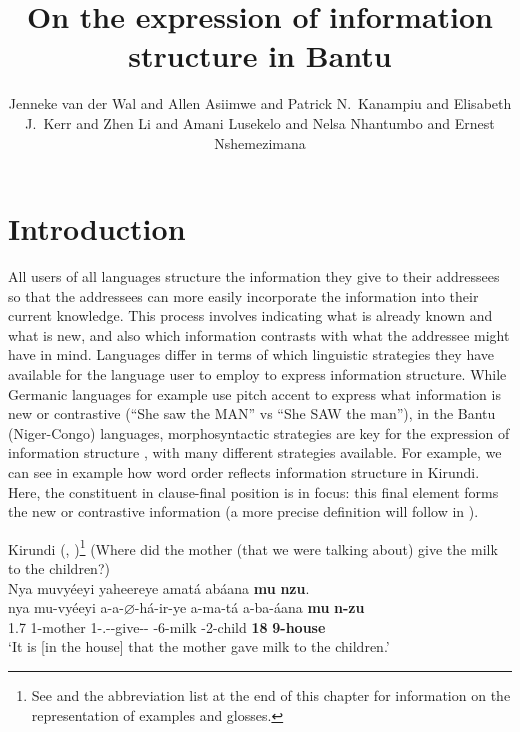\documentclass[output=paper]{langscibook}
\author{Jenneke van der Wal\affiliation{Leiden University} and Allen Asiimwe\affiliation{Makerere University} and Patrick N.\ Kanampiu\affiliation{University of Edinburgh} and Elisabeth J.\ Kerr\affiliation{Ghent University} and Zhen Li\affiliation{Peking University} and Amani Lusekelo\affiliation{Dar es Salaam College of Education} and Nelsa Nhantumbo\affiliation{Universidade Eduardo Mondlane} and Ernest Nshemezimana\affiliation{Université du Burundi}}
\title{On the expression of information structure in Bantu}
\begin{document}
\renewcommand{\lsChapterFooterSize}{\footnotesize}
\maketitle 
\label{ch:1}


\section{Introduction}

All users of all languages structure the information they give to their addressees so that the addressees can more easily incorporate the information into their current knowledge. This process involves indicating what is already known and what is new, and also which information contrasts with what the addressee might have in mind. Languages differ in terms of which linguistic strategies they have available for the language user to employ to express information structure. While Germanic languages for example use pitch accent to express what information is new or contrastive (“She saw the MAN” vs “She SAW the man”), in the Bantu (Niger-Congo) languages, morphosyntactic strategies are key for the expression of information structure \citep{DowningHyman2016,vanderWal2015,DowningMarten2019}, with many different strategies available. For example, we can see in example  how word order reflects information structure in Kirundi. Here, the constituent in clause-final position is in focus: this final element forms the new or contrastive information (a more precise definition will follow in ).

\ea
\label{ex:kirundi:1}
Kirundi (, \cite{chapters/kirundi})\footnote{See  and the abbreviation list at the end of this chapter for information on the representation of examples and glosses.}
\ea
(Where did the mother (that we were talking about) give the milk to the children?)\\
Nya muvyéeyi yaheereye amatá abáana \textbf{mu} \textbf{nzu}. \\
\gll
nya  mu-vyéeyi  a-a-$\varnothing$-há-ir-ye  a-ma-tá  a-ba-áana \textbf{mu}  \textbf{n-zu}  \\
  1.\DEM{}7  1-mother  1\SM-\N.\PST{}-\CJ{}-give-\APPL-\PFV{}  \AUG-{}6-milk  \AUG-{}2-child \textbf{18}  \textbf{9-house} \\
\glt ‘It is [in the house]\textsubscript{\FOC} that the mother gave milk to the children.’\\
\end{document}
